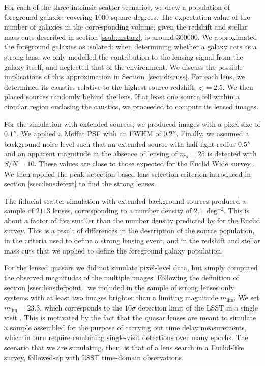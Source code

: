 \documentclass{aa}
\def\zsource{z_{\mathrm{s}}}
\def\msource{m_{\mathrm{s}}}
\def\Sref#1{Section~\ref{#1}\xspace}
\begin{document}
For each of the three intrinsic scatter scenarios, we drew a population of foreground galaxies covering $1000$ square degrees.
The expectation value of the number of galaxies in the corresponding volume, given the redshift and stellar mass cuts described in section \ref{ssub:mstarz}, is around $300000$.
We approximated the foreground galaxies as isolated: when determining whether a galaxy acts as a strong lens, we only modelled the contribution to the lensing signal from the galaxy itself, and neglected that of the environment.
We discuss the possible implications of this approximation in \Sref{sect:discuss}.
For each lens, we determined its caustics relative to the highest source redshift, $\zsource=2.5$. We then placed sources randomly behind the lens. If at least one source fell within a circular region enclosing the caustics, we proceeded to compute its lensed images.


For the simulation with extended sources, we produced images with a pixel size of $0.1''$.
We applied a Moffat PSF with an FWHM of $0.2''$.
Finally, we assumed a background noise level such that an extended source with half-light radius $0.5''$ and an apparent magnitude in the absence of lensing of $\msource=25$ is detected with $S/N=10$.
These values are close to those expected for the Euclid Wide survey \citep{Sca++22}.
%
We then applied the peak detection-based lens selection criterion introduced in section \ref{ssec:lensdefext} to find the strong lenses.

The fiducial scatter simulation with extended background sources produced a sample of $2113$ lenses, corresponding to a number density of $2.1$~deg$^{-2}$. This is about a factor of five smaller than the number density predicted by \citet{Col15} for the Euclid survey. This is a result of differences in the description of the source population, in the criteria used to define a strong lensing event, and in the redshift and stellar mass cuts that we applied to define the foreground galaxy population.

For the lensed quasars we did not simulate pixel-level data, but simply computed the observed magnitudes of the multiple images.
Following the definition of section \ref{ssec:lensdefpoint}, we included in the sample of strong lenses only systems with at least two images brighter than a limiting magnitude $m_{\mathrm{lim}}$.
We set $m_{\mathrm{lim}}=23.3$, which corresponds to the $10\sigma$ detection limit of the LSST in a single visit \citep{O+M10}. This is motivated by the fact that the quasar lenses are meant to simulate a sample assembled for the purpose of carrying out time delay measurements, which in turn require combining single-visit detections over many epochs.
The scenario that we are simulating, then, is that of a lens search in a Euclid-like survey, followed-up with LSST time-domain observations.
\end{document}
